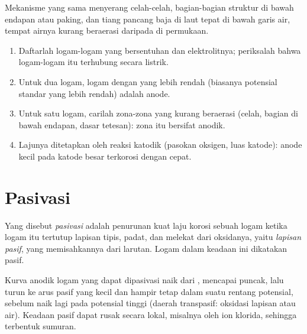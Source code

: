 Mekanisme yang sama menyerang celah-celah, bagian-bagian struktur di bawah
endapan atau paking, dan tiang pancang baja di laut tepat di bawah garis
air, tempat airnya kurang beraerasi daripada di permukaan.

\begin{method}\label{met:b2:corrosion:diagnose}
\begin{enumerate}
  \item Daftarlah logam-logam yang bersentuhan dan elektrolitnya;
        periksalah bahwa logam-logam itu terhubung secara listrik.
  \item Untuk dua logam, logam dengan  yang lebih rendah
        (biasanya potensial standar yang lebih rendah) adalah anode.
  \item Untuk satu logam, carilah zona-zona yang kurang beraerasi (celah,
        bagian di bawah endapan, dasar tetesan): zona itu bersifat anodik.
  \item Lajunya ditetapkan oleh reaksi katodik (pasokan oksigen, luas
        katode): anode kecil pada katode besar terkorosi dengan cepat.
\end{enumerate}
\end{method}

\section{Pasivasi}

\begin{definition}[Pasivasi]\label{def:b2:corrosion:passivation}
Yang disebut \emph{pasivasi} adalah penurunan kuat laju
korosi sebuah logam ketika logam itu tertutup lapisan tipis, padat, dan
melekat dari oksidanya, yaitu \emph{lapisan pasif},
yang memisahkannya dari larutan. Logam dalam keadaan ini dikatakan pasif.
\end{definition}

\begin{proposition}\label{prop:b2:corrosion:passivity}
Kurva anodik logam yang dapat dipasivasi naik dari ,
mencapai puncak, lalu turun ke arus pasif yang kecil dan hampir tetap dalam
suatu rentang potensial, sebelum naik lagi pada potensial tinggi (daerah
transpasif: oksidasi lapisan atau air). Keadaan pasif dapat rusak secara
lokal, misalnya oleh ion klorida, sehingga terbentuk sumuran.
\end{proposition}

